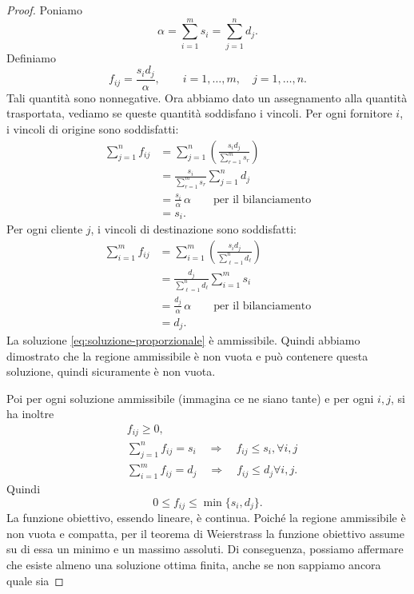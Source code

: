 \begin{proof}
Poniamo
\[
\alpha=\sum_{i=1}^m s_i=\sum_{j=1}^n d_j.
\]
Definiamo
\begin{equation}
f_{ij}=\frac{s_i d_j}{\alpha},
\qquad i=1,\ldots,m,\quad j=1,\ldots,n.
\tag{3.2}\label{eq:soluzione-proporzionale}
\end{equation}
Tali quantità sono nonnegative. Ora abbiamo dato un assegnamento alla quantità trasportata, vediamo se queste quantità soddisfano i vincoli.
Per ogni fornitore \(i\), i vincoli di origine sono soddisfatti:
\begin{align*}
\sum_{j=1}^n f_{ij}
&=\sum_{j=1}^n\left(\frac{s_i d_j}{\sum_{r=1}^m s_r}\right)\\
&=\frac{s_i}{\sum_{r=1}^m s_r}\sum_{j=1}^n d_j\\
&=\frac{s_i}{\alpha}\,\alpha
\qquad\text{per il bilanciamento}\\
&=s_i.
\end{align*}
Per ogni cliente \(j\), i vincoli di destinazione sono soddisfatti:
\begin{align*}
\sum_{i=1}^m f_{ij}
&=\sum_{i=1}^m\left(\frac{s_i d_j}{\sum_{\ell=1}^n d_\ell}\right)\\
&=\frac{d_j}{\sum_{\ell=1}^n d_\ell}\sum_{i=1}^m s_i\\
&=\frac{d_j}{\alpha}\,\alpha
\qquad\text{per il bilanciamento}\\
&=d_j.
\end{align*}
La soluzione \eqref{eq:soluzione-proporzionale} è ammissibile.
Quindi abbiamo dimostrato che la regione ammissibile è non vuota e può contenere questa soluzione, quindi sicuramente è non vuota.


Poi per ogni soluzione ammissibile (immagina ce ne siano tante) e per ogni \(i,j\), si ha inoltre
\begin{align*}
&f_{ij}\geq0,\\
&\sum_{j=1}^n f_{ij}=s_i
\quad\Longrightarrow\quad f_{ij}\leq s_i, \forall i,j\\
&\sum_{i=1}^m f_{ij}=d_j
\quad\Longrightarrow\quad f_{ij}\leq d_j \forall i,j.
\end{align*}
Quindi
\[
0\leq f_{ij}\leq\min\{s_i,d_j\}.
\]
La funzione obiettivo, essendo lineare, è continua. Poiché la regione ammissibile è non vuota e compatta, per il teorema di Weierstrass la funzione obiettivo assume su di essa un minimo e un massimo assoluti. Di conseguenza, possiamo affermare che esiste almeno una soluzione ottima finita, anche se non sappiamo ancora quale sia
\end{proof}


